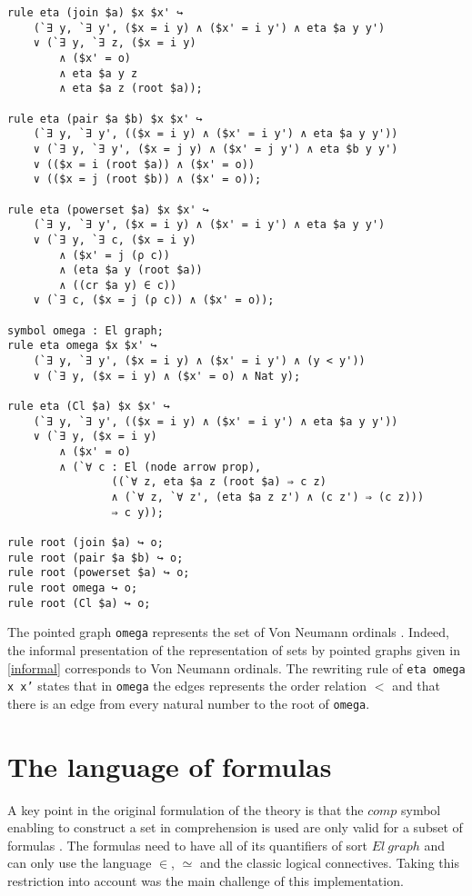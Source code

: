 \documentclass[a4paper]{article}
\begin{document}
\begin{lstlisting}
rule eta (join $a) $x $x' ↪ 
	(`∃ y, `∃ y', ($x = i y) ∧ ($x' = i y') ∧ eta $a y y')
    ∨ (`∃ y, `∃ z, ($x = i y) 
    	∧ ($x' = o) 
    	∧ eta $a y z 
    	∧ eta $a z (root $a));

rule eta (pair $a $b) $x $x' ↪ 
	(`∃ y, `∃ y', (($x = i y) ∧ ($x' = i y') ∧ eta $a y y'))
    ∨ (`∃ y, `∃ y', ($x = j y) ∧ ($x' = j y') ∧ eta $b y y')
    ∨ (($x = i (root $a)) ∧ ($x' = o))
    ∨ (($x = j (root $b)) ∧ ($x' = o));

rule eta (powerset $a) $x $x' ↪ 
	(`∃ y, `∃ y', ($x = i y) ∧ ($x' = i y') ∧ eta $a y y')
    ∨ (`∃ y, `∃ c, ($x = i y) 
    	∧ ($x' = j (ρ c)) 
    	∧ (eta $a y (root $a)) 
    	∧ ((cr $a y) ∈ c))
    ∨ (`∃ c, ($x = j (ρ c)) ∧ ($x' = o));

symbol omega : El graph;
rule eta omega $x $x' ↪ 
	(`∃ y, `∃ y', ($x = i y) ∧ ($x' = i y') ∧ (y < y'))
    ∨ (`∃ y, ($x = i y) ∧ ($x' = o) ∧ Nat y);

rule eta (Cl $a) $x $x' ↪ 
	(`∃ y, `∃ y', (($x = i y) ∧ ($x' = i y') ∧ eta $a y y'))
    ∨ (`∃ y, ($x = i y) 
        ∧ ($x' = o)
        ∧ (`∀ c : El (node arrow prop), 
                ((`∀ z, eta $a z (root $a) ⇒ c z)
                ∧ (`∀ z, `∀ z', (eta $a z z') ∧ (c z') ⇒ (c z)))
            	⇒ c y));
            
rule root (join $a) ↪ o;
rule root (pair $a $b) ↪ o;
rule root (powerset $a) ↪ o;
rule root omega ↪ o;
rule root (Cl $a) ↪ o;

\end{lstlisting}

The pointed graph \texttt{omega} represents the set of Von Neumann ordinals \cite[see][Table 2]{zermodulo53}. Indeed, the informal presentation of the representation of sets by pointed graphs given in \ref{informal} corresponds to Von Neumann ordinals. The rewriting rule of \texttt{eta omega x x'} states that in \texttt{omega} the edges represents the order relation $<$ and that there is an edge from every natural number to the root of \texttt{omega}.


\section{The language of formulas}

A key point in the original formulation of the theory is that the $comp$ symbol enabling to construct a set in comprehension is used are only valid for a subset of formulas \cite[see][Table 5]{zermodulo}. The formulas need to have all of its quantifiers of sort $El~graph$ and can only use the language $\in$, $\simeq$ and the classic logical connectives. Taking this restriction into account was the main challenge of this implementation.
\end{document}
